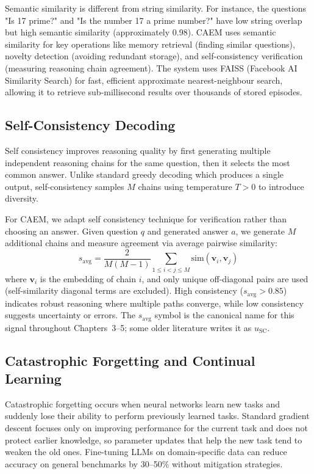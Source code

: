Semantic similarity is different from string similarity. For instance, the questions "Is 17 prime?" and "Is the number 17 a prime number?" have low string overlap but high semantic similarity (approximately 0.98). CAEM uses semantic similarity for key operations like memory retrieval (finding similar questions), novelty detection (avoiding redundant storage), and self-consistency verification (measuring reasoning chain agreement). The system uses FAISS (Facebook AI Similarity Search) \cite{8733051} for fast, efficient approximate nearest-neighbour search, allowing it to retrieve sub-millisecond results over thousands of stored episodes.

\subsection{Self-Consistency Decoding}

Self consistency \cite{wang2023selfconsistency} improves reasoning quality by first generating multiple independent reasoning chains for the same question, then it selects the most common answer. Unlike standard greedy decoding which produces a single output, self-consistency samples $M$ chains using temperature $T > 0$ to introduce diversity.

For CAEM, we adapt self consistency technique for verification rather than choosing an answer. Given question $q$ and generated answer $a$, we generate $M$ additional chains and measure agreement via average pairwise similarity:
\begin{equation}
s_{\text{avg}} = \frac{2}{M(M-1)} \sum_{1 \le i < j \le M} \text{sim}(\mathbf{v}_i, \mathbf{v}_j)
\end{equation}
where $\mathbf{v}_i$ is the embedding of chain $i$, and only unique off-diagonal pairs are used (self-similarity diagonal terms are excluded). High consistency ($s_{\text{avg}} > 0.85$) indicates robust reasoning where multiple paths converge, while low consistency suggests uncertainty or errors. The $s_{\text{avg}}$ symbol is the canonical name for this signal throughout Chapters~3--5; some older literature writes it as $u_{\text{SC}}$.

\subsection{Catastrophic Forgetting and Continual Learning}

Catastrophic forgetting \cite{MCCLOSKEY1989109} occurs when neural networks learn new tasks and suddenly lose their ability to perform previously learned tasks. Standard gradient descent focuses only on improving performance for the current task and does not protect earlier knowledge, so parameter updates that help the new task tend to weaken the old ones. Fine-tuning LLMs on domain-specific data can reduce accuracy on general benchmarks by 30--50\% without mitigation strategies.

